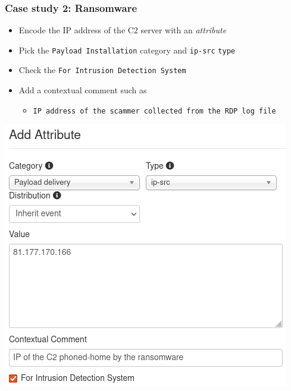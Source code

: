 \begin{frame}
    \frametitle{Case study 2: Ransomware}
    \begin{itemize}
        \item Encode the IP address of the C2 server with an \textit{attribute}
        \item Pick the \texttt{Payload Installation} category and \texttt{ip-src}  \texttt{type}
        \item Check the \texttt{For Intrusion Detection System}
        \item Add a contextual comment such as
        \begin{itemize}
            \item \texttt{IP address of the scammer collected from the RDP log file}
        \end{itemize}
    \end{itemize}
    \begin{center}
        \includegraphics[width=0.42\linewidth]{pictures/case2/attribute-ip.png}
    \end{center}
\end{frame}

